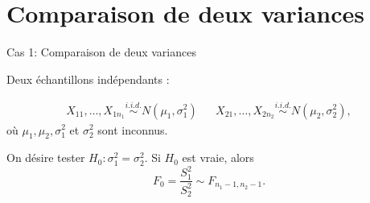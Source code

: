 \documentclass{BeamerTemplate}
\begin{document}

\section{Comparaison de deux variances}\label{sec:eqvar}


\begin{frame}[t]{Cas 1: Comparaison de deux variances}

Deux échantillons \alert{indépendants} :

\begin{align*}
X_{11}, \ldots, X_{1n_1} \overset{i.i.d.}{\sim} N(\mu_1, \sigma^2_1) & &  X_{21}, \ldots, X_{2n_2} \overset{i.i.d.}{\sim} N(\mu_2, \sigma^2_2),
\end{align*}
o\`u $\mu_1, \mu_2, \sigma^2_1$ et $\sigma^2_2$ sont inconnus.


\medskip
On désire tester \alert{$H_0: \sigma^2_1 = \sigma_2^2$}.
Si $H_0$ est vraie, alors
$$
F_0 = \frac{S_1^2}{S_2^2} \sim F_{n_1-1, n_2 -1}.
$$
\end{frame}
\end{document}
